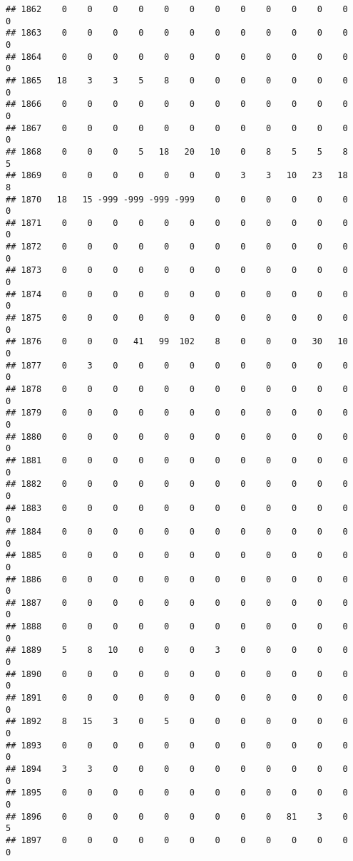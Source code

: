 \documentclass[]{article}
\begin{document}
\begin{verbatim}
## 1862    0    0    0    0    0    0    0    0    0    0    0    0    0
## 1863    0    0    0    0    0    0    0    0    0    0    0    0    0
## 1864    0    0    0    0    0    0    0    0    0    0    0    0    0
## 1865   18    3    3    5    8    0    0    0    0    0    0    0    0
## 1866    0    0    0    0    0    0    0    0    0    0    0    0    0
## 1867    0    0    0    0    0    0    0    0    0    0    0    0    0
## 1868    0    0    0    5   18   20   10    0    8    5    5    8    5
## 1869    0    0    0    0    0    0    0    3    3   10   23   18    8
## 1870   18   15 -999 -999 -999 -999    0    0    0    0    0    0    0
## 1871    0    0    0    0    0    0    0    0    0    0    0    0    0
## 1872    0    0    0    0    0    0    0    0    0    0    0    0    0
## 1873    0    0    0    0    0    0    0    0    0    0    0    0    0
## 1874    0    0    0    0    0    0    0    0    0    0    0    0    0
## 1875    0    0    0    0    0    0    0    0    0    0    0    0    0
## 1876    0    0    0   41   99  102    8    0    0    0   30   10    0
## 1877    0    3    0    0    0    0    0    0    0    0    0    0    0
## 1878    0    0    0    0    0    0    0    0    0    0    0    0    0
## 1879    0    0    0    0    0    0    0    0    0    0    0    0    0
## 1880    0    0    0    0    0    0    0    0    0    0    0    0    0
## 1881    0    0    0    0    0    0    0    0    0    0    0    0    0
## 1882    0    0    0    0    0    0    0    0    0    0    0    0    0
## 1883    0    0    0    0    0    0    0    0    0    0    0    0    0
## 1884    0    0    0    0    0    0    0    0    0    0    0    0    0
## 1885    0    0    0    0    0    0    0    0    0    0    0    0    0
## 1886    0    0    0    0    0    0    0    0    0    0    0    0    0
## 1887    0    0    0    0    0    0    0    0    0    0    0    0    0
## 1888    0    0    0    0    0    0    0    0    0    0    0    0    0
## 1889    5    8   10    0    0    0    3    0    0    0    0    0    0
## 1890    0    0    0    0    0    0    0    0    0    0    0    0    0
## 1891    0    0    0    0    0    0    0    0    0    0    0    0    0
## 1892    8   15    3    0    5    0    0    0    0    0    0    0    0
## 1893    0    0    0    0    0    0    0    0    0    0    0    0    0
## 1894    3    3    0    0    0    0    0    0    0    0    0    0    0
## 1895    0    0    0    0    0    0    0    0    0    0    0    0    0
## 1896    0    0    0    0    0    0    0    0    0   81    3    0    5
## 1897    0    0    0    0    0    0    0    0    0    0    0    0    0

\end{verbatim}
\end{document}
